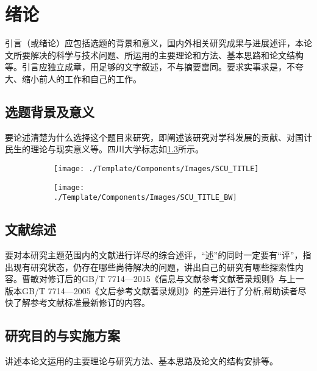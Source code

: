 
\chapter{绪论}%
引言（或绪论）应包括选题的背景和意义，国内外相关研究成果与进展述评，本论文所要解决的科学与技术问题、所运用的主要理论和方法、基本思路和论文结构等。引言应独立成章，用足够的文字叙述，不与摘要雷同。要求实事求是，不夸大、缩小前人的工作和自己的工作。
\section{选题背景及意义}
要论述清楚为什么选择这个题目来研究，即阐述该研究对学科发展的贡献、对国计民生的理论与现实意义等。四川大学标志如\cref{fig:test}所示。
\begin{figure}[!htb]
    \centering
    \begin{subfigure}[b]{0.35\textwidth}
    \texttt{[image: ./Template/Components/Images/SCU\_TITLE]}
    \label{fig:sub_a}
    \end{subfigure}%
    \qquad
    \begin{subfigure}[b]{0.35\textwidth}
        \texttt{[image: ./Template/Components/Images/SCU\_TITLE\_BW]}
        \label{fig:sub_b}
    \end{subfigure}%
    \label{fig:test}
\end{figure}

\section{文献综述}
要对本研究主题范围内的文献进行详尽的综合述评，“述”的同时一定要有“评”，指出现有研究状态，仍存在哪些尚待解决的问题，讲出自己的研究有哪些探索性内容。曹敏\cite{曹敏GB,陈浩元2015gb}对修订后的GB/T 7714—2015《信息与文献参考文献著录规则》与上一版本GB/T 7714—2005《文后参考文献著录规则》的差异进行了分析,帮助读者尽快了解参考文献标准最新修订的内容。
\section{研究目的与实施方案}
讲述本论文运用的主要理论与研究方法、基本思路及论文的结构安排等。

